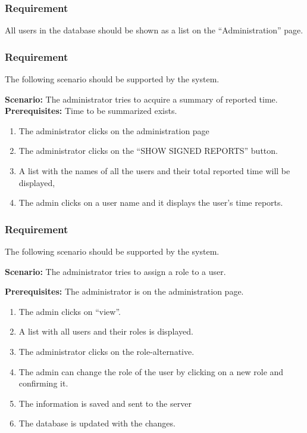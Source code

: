 \documentclass{article}
\begin{document}
\subsubsection{Requirement}
All users in the database should be shown as a list on the “Administration” page.

\subsubsection{Requirement}
The following scenario should be supported by the system.

\textbf{Scenario:} The administrator tries to acquire a summary of reported time.
\textbf{Prerequisites:} Time to be summarized exists.

\begin{enumerate}
    \item The administrator clicks on the administration page 
    \item The administrator clicks on the “SHOW SIGNED REPORTS” button.
    \item A list with the names of all the users and their total reported time will be displayed,
    \item The admin clicks on a user name and it displays the user’s time reports.
\end{enumerate}

\subsubsection{Requirement}
The following scenario should be supported by the system.

\textbf{Scenario:} The administrator tries to assign a role to a user.

\textbf{Prerequisites:} The administrator is on the administration page.

\begin{enumerate}
    \item The admin clicks on “view”.
    \item A list with all users and their roles is displayed.
    \item The administrator clicks on the role-alternative.
    \item The admin can change the role of the user by clicking on a new role and confirming it.
    \item The information is saved and sent to the server
    \item The database is updated with the changes.
\end{enumerate}
\end{document}

